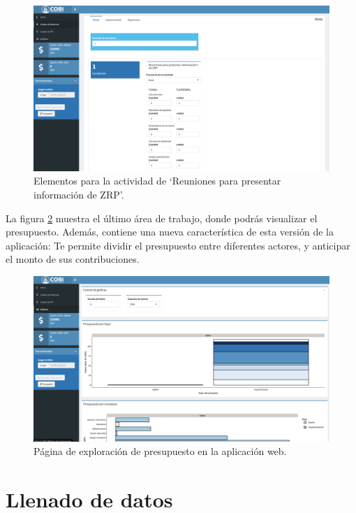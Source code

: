 \documentclass[
]{book}
\begin{document}
\begin{figure}
\centering
\includegraphics{images/Screen Shot 2022-07-25 at 3.08.10 PM.png}
\caption{\label{fig:elements}Elementos para la actividad de `Reuniones para presentar información de ZRP'.}
\end{figure}

La figura \ref{fig:viewing-page} muestra el último área de trabajo, donde podrás visualizar el presupuesto. Además, contiene una nueva característica de esta versión de la aplicación: Te permite dividir el presupuesto entre diferentes actores, y anticipar el monto de sus contribuciones.

\begin{figure}
\centering
\includegraphics{images/Screen Shot 2022-07-25 at 2.56.18 PM.png}
\caption{\label{fig:viewing-page}Página de exploración de presupuesto en la aplicación web.}
\end{figure}

\hypertarget{llenado}{%
\chapter{Llenado de datos}\label{llenado}}
\end{document}
